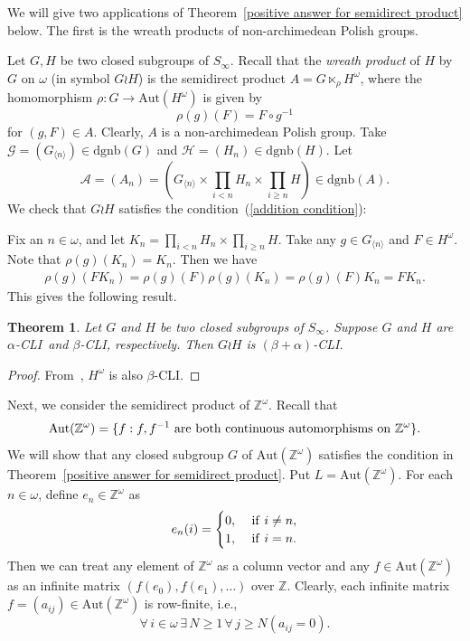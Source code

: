 \documentclass[11pt]{amsart}
\newtheorem{theorem}{Theorem}[section]
\theoremstyle{definition}
\theoremstyle{remark}
\numberwithin{equation}{section}
\def\Z {{\mathbb{Z}}}
\def\dgnb{{\mathrm{dgnb}}}
\def\gnb#1{G_{\langle #1\rangle}}
\def\hier#1{$#1$-CLI}
\def\aut{{\mathrm{Aut}}}
\def\itx#1{{\mbox{\textrm{ #1 }}}}
\begin{document}
We will give two applications of Theorem~\ref{positive answer for semidirect product} below. The first is the wreath products of non-archimedean Polish groups.

Let $G,H$ be two closed subgroups of $S_\infty$. Recall that the {\it wreath product} of $H$ by $G$ on $\omega$ (in symbol $G\wr H$) is the semidirect product $A=G\ltimes_\rho H^\omega$, where the homomorphism $\rho:G\to\aut(H^\omega)$ is given by%
    $$\rho(g)(F)=F\circ g^{-1}$$
    for $(g,F)\in A$. Clearly, $A$ is a non-archimedean Polish group. Take $\mathcal{G}=(\gnb{n})\in\dgnb(G)$ and $\mathcal{H}=(H_n)\in\dgnb(H)$. Let
    $$\mathcal{A}=(A_n)=\left(\gnb{n}\times\prod_{i<n}H_n\times\prod_{i\geq n}H\right)\in\dgnb(A).$$
    We check that $G\wr H$ satisfies the condition~(\ref{addition condition}):

    Fix an $n\in\omega$, and let $K_n=\prod_{i<n}H_n\times\prod_{i\geq n}H$. Take any $g\in\gnb{n}$ and $F\in H^\omega$. Note that $\rho(g)(K_n)=K_n$. Then we have
    \begin{align*}
        \rho(g)(FK_n)=\rho(g)(F)\rho(g)(K_n)=\rho(g)(F)K_n=FK_n.
    \end{align*}
This gives the following result.

\begin{theorem}
    Let $G$ and $H$ be two closed subgroups of $S_\infty$. Suppose $G$ and $H$ are \hier\alpha\ and \hier\beta, respectively. Then $G\wr H$ is \hier{(\beta+\alpha)}.
\end{theorem}

\begin{proof}
From~\cite[Theorem 4.6(1)]{DingW}, $H^\omega$ is also \hier\beta.
\end{proof}

Next, we consider the semidirect product of $\Z^\omega$. Recall that
$$\aut(\Z^\omega)=\{f:f,f^{-1}\itx{are both continuous automorphisms on}\Z^\omega\}.$$
We will show that any closed subgroup $G$ of $\aut(\Z^\omega)$ satisfies the condition in Theorem~\ref{positive answer for semidirect product}. Put $L=\aut(\Z^\omega)$. For each $n\in\omega$, define $e_n\in\Z^\omega$ as
\begin{equation*}
    e_n(i)=\begin{cases}
        0,&\itx{if}i\neq n,\\
        1,&\itx{if}i=n.
    \end{cases}
\end{equation*}
Then we can treat any element of $\Z^\omega$ as a column vector and any $f\in\aut(\Z^\omega)$ as an infinite matrix $(f(e_0),f(e_1),\dots)$ over $\Z$. Clearly, each infinite matrix $f=(a_{ij})\in\aut(\Z^\omega)$ is row-finite, i.e.,
$$\forall\,i\in\omega\,\exists\,N\geq 1\,\forall\,j\geq N(a_{ij}=0).$$
\end{document}
